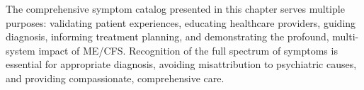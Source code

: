 The comprehensive symptom catalog presented in this chapter serves multiple purposes: validating patient experiences, educating healthcare providers, guiding diagnosis, informing treatment planning, and demonstrating the profound, multi-system impact of ME/CFS. Recognition of the full spectrum of symptoms is essential for appropriate diagnosis, avoiding misattribution to psychiatric causes, and providing compassionate, comprehensive care.

